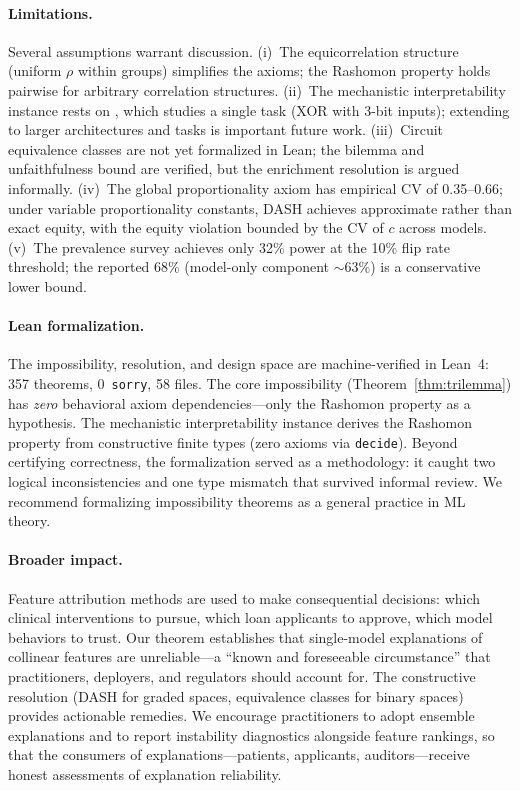 \paragraph{Limitations.}
Several assumptions warrant discussion.
(i)~The equicorrelation structure (uniform $\rho$ within groups) simplifies the axioms; the Rashomon property holds pairwise for arbitrary correlation structures.
(ii)~The mechanistic interpretability instance rests on \citet{meloux2025circuits}, which studies a single task (XOR with 3-bit inputs); extending to larger architectures and tasks is important future work.
(iii)~Circuit equivalence classes are not yet formalized in Lean; the bilemma and unfaithfulness bound are verified, but the enrichment resolution is argued informally.
(iv)~The global proportionality axiom has empirical CV of 0.35--0.66; under variable proportionality constants, DASH achieves approximate rather than exact equity, with the equity violation bounded by the CV of $c$ across models.
(v)~The prevalence survey achieves only 32\% power at the 10\% flip rate threshold; the reported 68\% (model-only component ${\sim}63\%$) is a conservative lower bound.

\paragraph{Lean formalization.}
The impossibility, resolution, and design space are machine-verified in Lean~4: 357 theorems, 0~\texttt{sorry}, 58 files. The core impossibility (Theorem~\ref{thm:trilemma}) has \emph{zero} behavioral axiom dependencies---only the Rashomon property as a hypothesis. The mechanistic interpretability instance derives the Rashomon property from constructive finite types (zero axioms via \texttt{decide}). Beyond certifying correctness, the formalization served as a methodology: it caught two logical inconsistencies and one type mismatch that survived informal review. We recommend formalizing impossibility theorems as a general practice in ML theory.

\paragraph{Broader impact.}
Feature attribution methods are used to make consequential decisions: which clinical interventions to pursue, which loan applicants to approve, which model behaviors to trust. Our theorem establishes that single-model explanations of collinear features are unreliable---a ``known and foreseeable circumstance'' that practitioners, deployers, and regulators should account for. The constructive resolution (DASH for graded spaces, equivalence classes for binary spaces) provides actionable remedies. We encourage practitioners to adopt ensemble explanations and to report instability diagnostics alongside feature rankings, so that the consumers of explanations---patients, applicants, auditors---receive honest assessments of explanation reliability.
